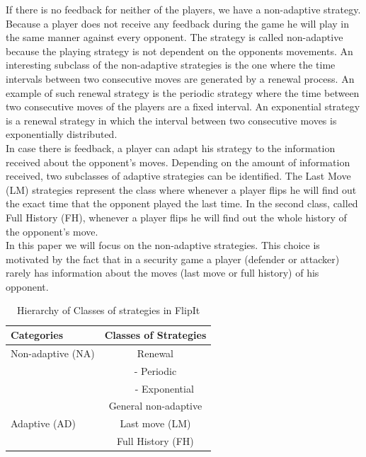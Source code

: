 If there is no feedback for neither of the players, we have a non-adaptive strategy. Because a player does not receive any feedback during the game he will play in the same manner against every opponent. The strategy is called non-adaptive because the playing strategy is not dependent on the opponents movements. An interesting subclass of the non-adaptive strategies is the one where the time intervals between two consecutive moves are generated by a renewal process. An example of such renewal strategy is the periodic strategy where the time between two consecutive moves of the players are a fixed interval. An exponential strategy is a renewal strategy in which the interval between two consecutive moves is exponentially distributed. \\
In case there is feedback, a player can adapt his strategy to the information received about the opponent's moves. Depending on the amount of information received, two subclasses of adaptive strategies can be identified. The Last Move (LM) strategies represent the class where whenever a player flips he will find out the exact time that the opponent played the last time. In the second class, called Full History (FH), whenever a player flips he will find out the whole history of the opponent's move. \\
In this paper we will focus on the non-adaptive strategies. This choice is motivated by the fact that in a security game a player (defender or attacker) rarely has information about the moves (last move or full history) of his opponent.  \\


 \begin{table}
 \centering
 \begin{tabular}{ l | c  }
  \textbf{Categories} & \textbf{Classes of Strategies} \\
  \hline Non-adaptive (NA) & Renewal \\
  & - Periodic \\
  & ~~~ - Exponential \\
  & General non-adaptive \\
  \hline Adaptive (AD) & Last move (LM) \\
  & Full History (FH) \\  
\end{tabular}
 \caption{Hierarchy of Classes of strategies in FlipIt}
 \label{table:Strategies}
 \end{table}

